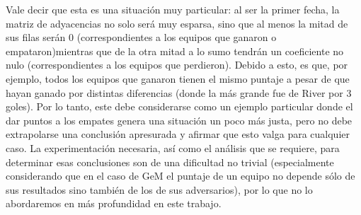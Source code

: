 Vale decir que esta es una situación muy particular: al ser la primer fecha, la matriz de adyacencias no solo será muy esparsa, sino que al menos la mitad de sus filas serán 0 (correspondientes a los equipos que ganaron o empataron)mientras que de la otra mitad a lo sumo tendrán un coeficiente no nulo (correspondientes a los equipos que perdieron). Debido a esto, es que, por ejemplo, todos los equipos que ganaron tienen el mismo puntaje a pesar de que hayan ganado por distintas diferencias (donde la más grande fue de River por 3 goles). Por lo tanto, este debe considerarse como un ejemplo particular donde el dar puntos a los empates genera una situación un poco más justa, pero no debe extrapolarse una conclusión apresurada y afirmar que esto valga para cualquier caso. La experimentación necesaria, así como el análisis que se requiere, para determinar esas conclusiones son de una dificultad no trivial (especialmente considerando que en el caso de GeM el puntaje de un equipo no depende sólo de sus resultados sino también de los de sus adversarios), por lo que no lo abordaremos en más profundidad en este trabajo.

